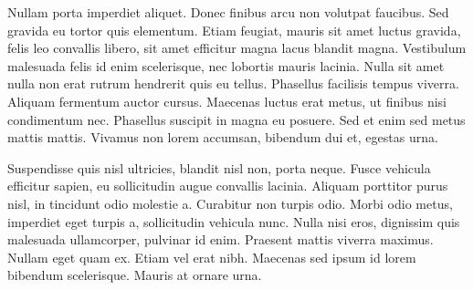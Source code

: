 \documentclass[12pt, a4paper]{article}
\begin{document}
Nullam porta imperdiet aliquet. Donec finibus arcu non volutpat faucibus. Sed gravida eu tortor quis elementum. Etiam feugiat, mauris sit amet luctus gravida, felis leo convallis libero, sit amet efficitur magna lacus blandit magna. Vestibulum malesuada felis id enim scelerisque, nec lobortis mauris lacinia. Nulla sit amet nulla non erat rutrum hendrerit quis eu tellus. Phasellus facilisis tempus viverra. Aliquam fermentum auctor cursus. Maecenas luctus erat metus, ut finibus nisi condimentum nec. Phasellus suscipit in magna eu posuere. Sed et enim sed metus mattis mattis. Vivamus non lorem accumsan, bibendum dui et, egestas urna.

Suspendisse quis nisl ultricies, blandit nisl non, porta neque. Fusce vehicula efficitur sapien, eu sollicitudin augue convallis lacinia. Aliquam porttitor purus nisl, in tincidunt odio molestie a. Curabitur non turpis odio. Morbi odio metus, imperdiet eget turpis a, sollicitudin vehicula nunc. Nulla nisi eros, dignissim quis malesuada ullamcorper, pulvinar id enim. Praesent mattis viverra maximus. Nullam eget quam ex. Etiam vel erat nibh. Maecenas sed ipsum id lorem bibendum scelerisque. Mauris at ornare urna.
\end{document}
